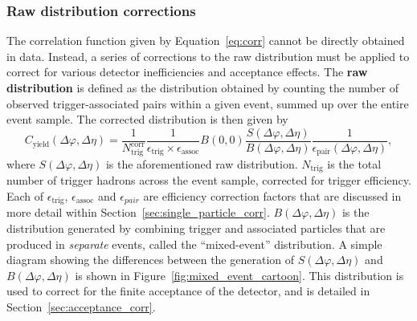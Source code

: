 \subsubsection{Raw distribution corrections}
\label{sec:raw_corr}
The correlation function given by Equation~\ref{eq:corr} cannot be directly obtained in data. Instead, a series of corrections to the raw distribution must be applied to correct for various detector inefficiencies and acceptance effects. The \textbf{raw distribution} is defined as the distribution obtained by counting the number of observed trigger-associated pairs within a given event, summed up over the entire event sample. The corrected distribution is then given by
%
\begin{equation}
    C_{\text{yield}}(\Delta\varphi, \Delta\eta) = \frac{1}{N_{\text{trig}}^{\text{corr}}}\frac{1}{\epsilon_{\text{trig}}\times\epsilon_{\text{assoc}}}B(0,0)\frac{S(\Delta\varphi, \Delta\eta)}{B(\Delta\varphi, \Delta\eta)}\frac{1}{\epsilon_{\text{pair}}(\Delta\varphi, \Delta\eta)},
\label{eq:corr_detector}
\end{equation}
%
where $S(\Delta\varphi, \Delta\eta)$ is the aforementioned raw distribution. $N_{\text{trig}}$ is the total number of trigger hadrons across the event sample, corrected for trigger efficiency. Each of $\epsilon_{\text{trig}}$, $\epsilon_{\text{assoc}}$ and $\epsilon_{pair}$ are efficiency correction factors that are discussed in more detail within Section~\ref{sec:single_particle_corr}.  $B(\Delta\varphi, \Delta\eta)$ is the distribution generated by combining trigger and associated particles that are produced in \textit{separate} events, called the ``mixed-event'' distribution. A simple diagram showing the differences between the generation of $S(\Delta\varphi, \Delta\eta)$ and $B(\Delta\varphi, \Delta\eta)$ is shown in Figure~\ref{fig:mixed_event_cartoon}. This distribution is used to correct for the finite acceptance of the detector, and is detailed in Section~\ref{sec:acceptance_corr}.

